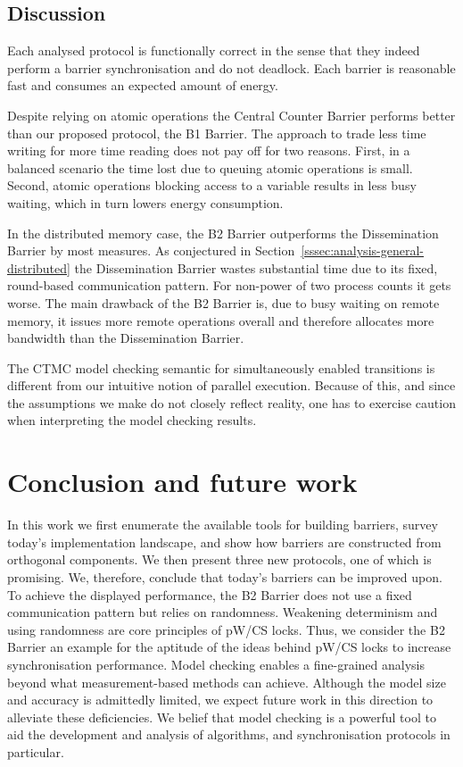 \documentclass[a4paper, 10pt]{article}
\begin{document}
\subsection{Discussion}
\label{ssec:analysis-discussion}
Each analysed protocol is functionally correct in the sense that they indeed perform a barrier synchronisation and do not deadlock.
Each barrier is reasonable fast and consumes an expected amount of energy.

Despite relying on atomic operations the Central Counter Barrier performs better than our proposed protocol, the B1 Barrier.
The approach to trade less time writing for more time reading does not pay off for two reasons.
First, in a balanced scenario the time lost due to queuing atomic operations is small. Second, atomic operations blocking access to a variable results in less busy waiting, which in turn lowers energy consumption.

In the distributed memory case, the B2 Barrier outperforms the Dissemination Barrier by most measures.
As conjectured in Section~\ref{sssec:analysis-general-distributed} the Dissemination Barrier wastes substantial time due to its fixed, round-based communication pattern. For non-power of two process counts it gets worse.
The main drawback of the B2 Barrier is, due to busy waiting on remote memory, it issues more remote operations overall and therefore allocates more bandwidth than the Dissemination Barrier.

The CTMC model checking semantic for simultaneously enabled transitions is different from our intuitive notion of parallel execution. Because of this, and since the assumptions we make do not closely reflect reality, one has to exercise caution when interpreting the model checking results.

\section{Conclusion and future work}
\label{sec:conclusion}
In this work we first enumerate the available tools for building barriers, survey today's implementation landscape, and show how barriers are constructed from orthogonal components.
We then present three new protocols, one of which is promising. We, therefore, conclude that today's barriers can be improved upon. To achieve the displayed performance, the B2 Barrier does not use a fixed communication pattern but relies on randomness. Weakening determinism and using randomness are core principles of pW/CS locks. Thus, we consider the B2 Barrier an example for the aptitude of the ideas behind pW/CS locks to increase synchronisation performance.
Model checking enables a fine-grained analysis beyond what measurement-based methods can achieve.
Although the model size and accuracy is admittedly limited, we expect future work in this direction to alleviate these deficiencies.
We belief that model checking is a powerful tool to aid the development and analysis of algorithms, and synchronisation protocols in particular.
\end{document}
